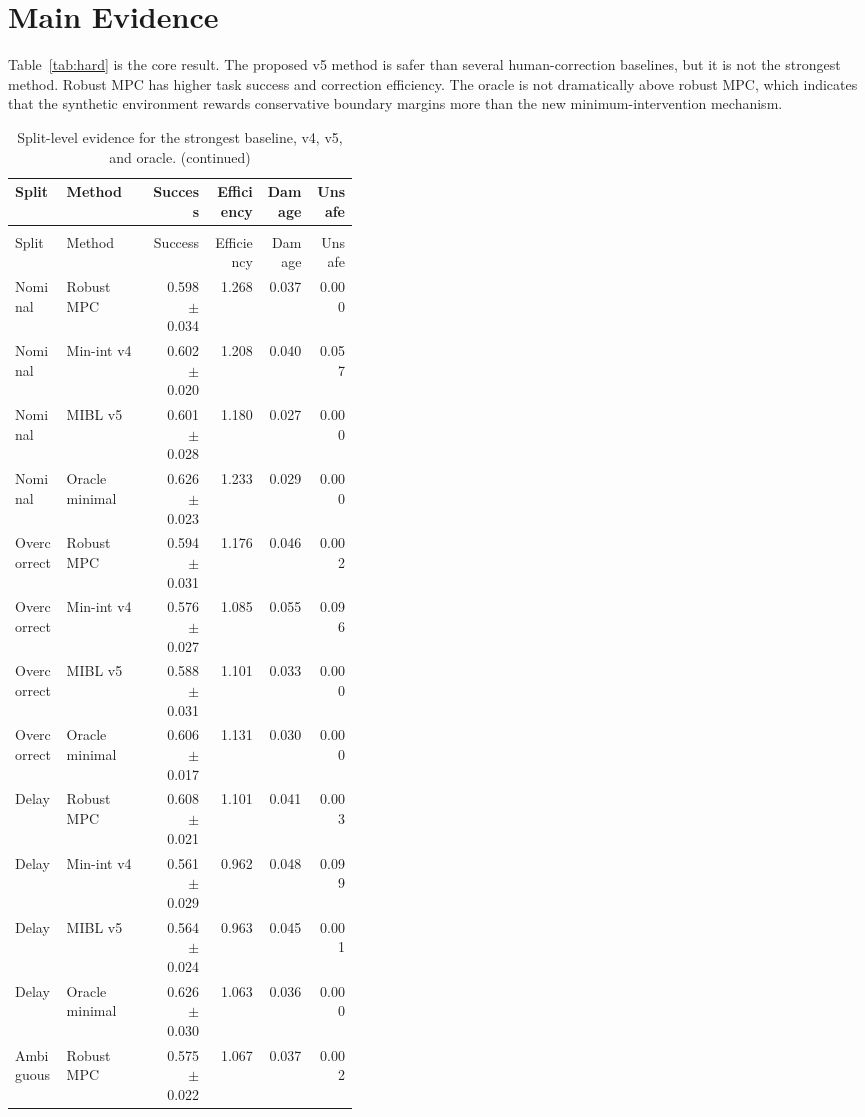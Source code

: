 \documentclass{article}
\begin{document}
\section{Main Evidence}
Table~\ref{tab:hard} is the core result. The proposed v5 method is safer than several human-correction baselines, but it is not the strongest method. Robust MPC has higher task success and correction efficiency. The oracle is not dramatically above robust MPC, which indicates that the synthetic environment rewards conservative boundary margins more than the new minimum-intervention mechanism.
\begin{center}
\scriptsize
\begin{longtable}{p{0.15\linewidth}p{0.25\linewidth}rrrr}
\caption{Split-level evidence for the strongest baseline, v4, v5, and oracle.}\label{tab:split}\\
\toprule
Split & Method & Success & Efficiency & Damage & Unsafe\\
\midrule
\endfirsthead
\caption[]{Split-level evidence for the strongest baseline, v4, v5, and oracle. (continued)}\\
\toprule
Split & Method & Success & Efficiency & Damage & Unsafe\\
\midrule
\endhead
Nominal & Robust MPC & 0.598 $\pm$ 0.034 & 1.268 & 0.037 & 0.000\\
Nominal & Min-int v4 & 0.602 $\pm$ 0.020 & 1.208 & 0.040 & 0.057\\
Nominal & MIBL v5 & 0.601 $\pm$ 0.028 & 1.180 & 0.027 & 0.000\\
Nominal & Oracle minimal & 0.626 $\pm$ 0.023 & 1.233 & 0.029 & 0.000\\
Overcorrect & Robust MPC & 0.594 $\pm$ 0.031 & 1.176 & 0.046 & 0.002\\
Overcorrect & Min-int v4 & 0.576 $\pm$ 0.027 & 1.085 & 0.055 & 0.096\\
Overcorrect & MIBL v5 & 0.588 $\pm$ 0.031 & 1.101 & 0.033 & 0.000\\
Overcorrect & Oracle minimal & 0.606 $\pm$ 0.017 & 1.131 & 0.030 & 0.000\\
Delay & Robust MPC & 0.608 $\pm$ 0.021 & 1.101 & 0.041 & 0.003\\
Delay & Min-int v4 & 0.561 $\pm$ 0.029 & 0.962 & 0.048 & 0.099\\
Delay & MIBL v5 & 0.564 $\pm$ 0.024 & 0.963 & 0.045 & 0.001\\
Delay & Oracle minimal & 0.626 $\pm$ 0.030 & 1.063 & 0.036 & 0.000\\
Ambiguous & Robust MPC & 0.575 $\pm$ 0.022 & 1.067 & 0.037 & 0.002\\

\end{longtable}
\end{center}
\end{document}
